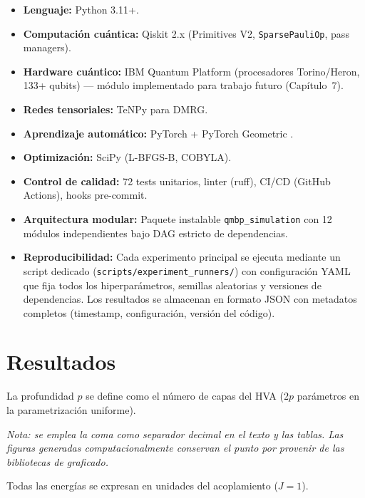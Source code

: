 \documentclass[11pt,a4paper,spanish]{book}
\begin{document}
\begin{itemize}
    \item \textbf{Lenguaje:} Python 3.11+.
    \item \textbf{Computación cuántica:} Qiskit 2.x (Primitives V2, \texttt{SparsePauliOp}, pass managers).
    \item \textbf{Hardware cuántico:} IBM Quantum Platform (procesadores Torino/Heron, 133+ qubits) --- módulo implementado para trabajo futuro (Capítulo~7).
    \item \textbf{Redes tensoriales:} TeNPy \citep{hauschild2018} para DMRG.
    \item \textbf{Aprendizaje automático:} PyTorch + PyTorch Geometric \citep{fey2019}.
    \item \textbf{Optimización:} SciPy (L-BFGS-B, COBYLA).
    \item \textbf{Control de calidad:} 72 tests unitarios, linter (ruff), CI/CD (GitHub Actions), hooks pre-commit.
    \item \textbf{Arquitectura modular:} Paquete instalable \texttt{qmbp\_simulation} con 12 módulos independientes bajo DAG estricto de dependencias.
    \item \textbf{Reproducibilidad:} Cada experimento principal se ejecuta mediante un script dedicado (\texttt{scripts/experiment\_runners/}) con configuración YAML que fija todos los hiperparámetros, semillas aleatorias y versiones de dependencias. Los resultados se almacenan en formato JSON con metadatos completos (timestamp, configuración, versión del código).
\end{itemize}



\chapter{Resultados}

La profundidad $p$ se define como el número de capas del HVA ($2p$ parámetros en la parametrización uniforme).

\noindent\textit{Nota: se emplea la coma como separador decimal en el texto y las tablas. Las figuras generadas computacionalmente conservan el punto por provenir de las bibliotecas de graficado.}

\noindent Todas las energías se expresan en unidades del acoplamiento ($J = 1$).
\end{document}

